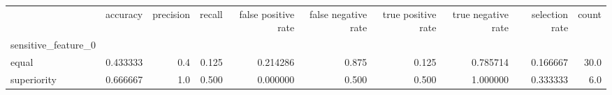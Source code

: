 \begin{tabular}{lrrrrrrrrr}
\toprule
{} &  accuracy &  precision &  recall &  false positive rate &  false negative rate &  true positive rate &  true negative rate &  selection rate &  count \\
sensitive\_feature\_0 &           &            &         &                      &                      &                     &                     &                 &        \\
\midrule
equal               &  0.433333 &        0.4 &   0.125 &             0.214286 &                0.875 &               0.125 &            0.785714 &        0.166667 &   30.0 \\
superiority         &  0.666667 &        1.0 &   0.500 &             0.000000 &                0.500 &               0.500 &            1.000000 &        0.333333 &    6.0 \\
\bottomrule
\end{tabular}
